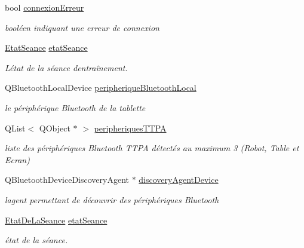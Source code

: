 \begin{DoxyCompactItemize}
bool \hyperlink{class_communication_bluetooth_a7b313bd3b054faaf59244a297880bf7a}{connexion\+Erreur}
\begin{DoxyCompactList}\small\item\em booléen indiquant une erreur de connexion \end{DoxyCompactList}\item 
\hyperlink{class_communication_bluetooth_a49447c8601e9214495f61f4f393e2133}{Etat\+Seance} \hyperlink{class_communication_bluetooth_adc66f3034d46f3964a26b62ad98e784f}{etat\+Seance}
\begin{DoxyCompactList}\small\item\em L\textquotesingle{}état de la séance d\textquotesingle{}entraînement. \end{DoxyCompactList}\item 
Q\+Bluetooth\+Local\+Device \hyperlink{class_communication_bluetooth_a03c857db65a9ea5a0b944844f675e6fa}{peripherique\+Bluetooth\+Local}
\begin{DoxyCompactList}\small\item\em le périphérique Bluetooth de la tablette \end{DoxyCompactList}\item 
Q\+List$<$ Q\+Object $\ast$ $>$ \hyperlink{class_communication_bluetooth_ad3032be59818aac8923565f0db6bf7c3}{peripheriques\+T\+T\+PA}
\begin{DoxyCompactList}\small\item\em liste des périphériques Bluetooth T\+T\+PA détectés au maximum 3 (Robot, Table et Ecran) \end{DoxyCompactList}\item 
Q\+Bluetooth\+Device\+Discovery\+Agent $\ast$ \hyperlink{class_communication_bluetooth_a9e04dbd88ba090525d6691cc1a4237b6}{discovery\+Agent\+Device}
\begin{DoxyCompactList}\small\item\em l\textquotesingle{}agent permettant de découvrir des périphériques Bluetooth \end{DoxyCompactList}\item 
\hyperlink{class_communication_bluetooth_a414353c68cf4b316937d7c929f20d22a}{Etat\+De\+La\+Seance} \hyperlink{class_communication_bluetooth_a15d0846d427f9d652c54d46d18f9bccb}{etat\+Seance}
\begin{DoxyCompactList}\small\item\em état de la séance. \end{DoxyCompactList}\end{DoxyCompactItemize}


